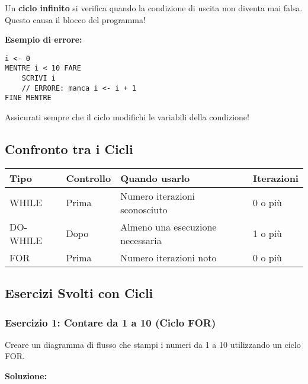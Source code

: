 \documentclass[a4paper,16pt]{article}
\begin{document}
\begin{tcolorbox}[colback=red!10!white,colframe=red!75!black,title=Attenzione: Cicli Infiniti!]
Un \textbf{ciclo infinito} si verifica quando la condizione di uscita non diventa mai falsa. Questo causa il blocco del programma!

\textbf{Esempio di errore:}
\begin{lstlisting}
i <- 0
MENTRE i < 10 FARE
    SCRIVI i
    // ERRORE: manca i <- i + 1
FINE MENTRE
\end{lstlisting}

Assicurati sempre che il ciclo modifichi le variabili della condizione!
\end{tcolorbox}

\subsection{Confronto tra i Cicli}

\begin{center}
\begin{tabular}{|p{3cm}|p{4cm}|p{4cm}|p{3cm}|}
\hline
\textbf{Tipo} & \textbf{Controllo} & \textbf{Quando usarlo} & \textbf{Iterazioni} \\
\hline
WHILE & Prima & Numero iterazioni sconosciuto & 0 o più \\
\hline
DO-WHILE & Dopo & Almeno una esecuzione necessaria & 1 o più \\
\hline
FOR & Prima & Numero iterazioni noto & 0 o più \\
\hline
\end{tabular}
\end{center}

\newpage
\subsection{Esercizi Svolti con Cicli}

\subsubsection{Esercizio 1: Contare da 1 a 10 (Ciclo FOR)}

\begin{tcolorbox}[colback=blue!5!white,colframe=blue!75!black,title=Traccia]
Creare un diagramma di flusso che stampi i numeri da 1 a 10 utilizzando un ciclo FOR.
\end{tcolorbox}

\textbf{Soluzione:}
\end{document}
